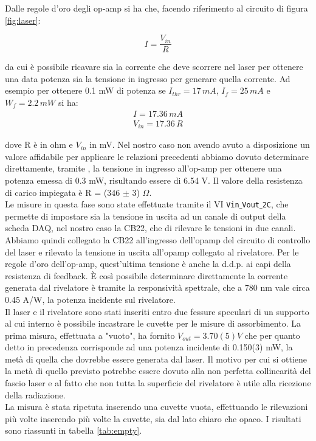 \documentclass[a4paper]{article}
\begin{document}
Dalle regole d'oro degli op-amp si ha che, facendo riferimento al circuito di figura \ref{fig:laser}:

\begin{equation}
I = \frac{V_{in}}{R}
\end{equation}

da cui è possibile ricavare sia la corrente che deve scorrere nel laser per ottenere una data potenza sia la tensione in ingresso per generare quella corrente. Ad esempio per ottenere 0.1 mW di potenza se $I_{thr} = 17\, mA$, $I_f = 25 \, mA$ e $W_f= 2.2 \, mW$ si ha:
\begin{gather}
I = 17.36 \, mA \\
V_{in} = 17.36 \, R
\end{gather}

dove R è in ohm e $V_{in}$ in mV. Nel nostro caso non avendo avuto a disposizione un valore affidabile per applicare le relazioni precedenti abbiamo dovuto determinare direttamente, tramite ,
la tensione in ingresso all'op-amp per ottenere una potenza emessa di 0.3 mW, risultando essere di 6.54 V. Il valore della resistenza di carico impiegata è R = (346 $\pm$ 3) $\Omega$.\\
Le misure in questa fase sono state effettuate tramite il VI \texttt{Vin$\_$Vout$\_$2C}, che permette di impostare sia la tensione in uscita ad un canale di output della scheda DAQ, nel nostro caso la CB22, che di rilevare le tensioni in due canali. Abbiamo quindi collegato la CB22 all'ingresso dell'opamp del circuito di controllo del laser e rilevato la tensione in uscita all'opamp collegato al rivelatore. Per le regole d'oro dell'op-amp, quest'ultima tensione è anche la d.d.p. ai capi della resistenza di feedback. È così possibile determinare direttamente la corrente generata dal rivelatore è tramite la responsività spettrale, che a 780 nm vale circa 0.45 A/W, la potenza incidente sul rivelatore.\\
Il laser e il rivelatore sono stati inseriti entro due fessure speculari di un supporto al cui interno è possibile incastrare le cuvette per le misure di assorbimento. La prima misura, effettuata a "vuoto", ha fornito $V_{out} = 3.70(5) V$ che per quanto detto in precedenza corrisponde ad una potenza incidente di 0.150(3) mW, la metà di quella che dovrebbe essere generata dal laser. Il motivo per cui si ottiene la metà di quello previsto potrebbe essere dovuto alla non perfetta collinearità del fascio laser e al fatto che non tutta la superficie del rivelatore è utile alla ricezione della radiazione.\\
La misura è stata ripetuta inserendo una cuvette vuota, effettuando le rilevazioni più volte inserendo più volte la cuvette, sia dal lato chiaro che opaco. I risultati sono riassunti in tabella \ref{tab:empty}.
\end{document}
